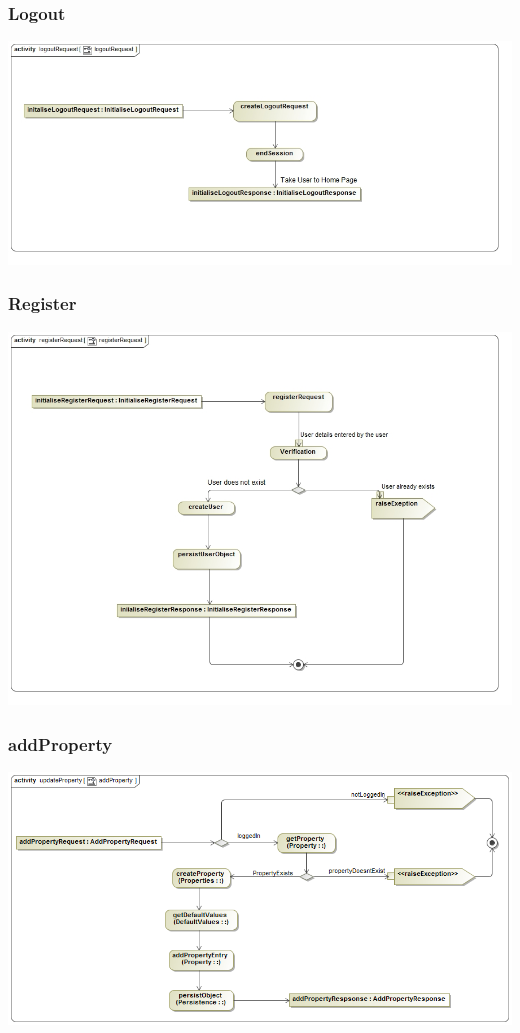 \documentclass[a4paper,12pt]{article}
\begin{document}
\subsubsection{Logout}
\includegraphics[width=1\textwidth]{./Images/processSpecification/Priscilla/logoutRequest.jpg}
\subsubsection{Register}
\includegraphics[width=1\textwidth]{./Images/processSpecification/Priscilla/registerRequest.jpg}
\subsubsection{addProperty}
\includegraphics[width=1\textwidth]{./Images/processSpecification/addProperty.png}
\end{document}
